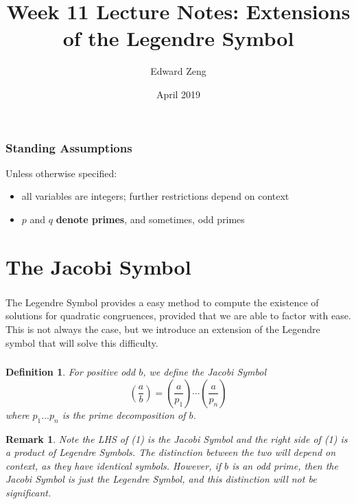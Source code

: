 \documentclass[12pt]{article}
\title{Week 11 Lecture Notes: Extensions of the Legendre Symbol}
\author{Edward Zeng}
\date{April 2019}
\newtheorem{definition}{Definition}
\newtheorem*{remark}{Remark}
\newcommand{\legendre}[2]{\genfrac{(}{)}{}{}{#1}{#2}}
\newcommand{\jacobi}[2]{\genfrac{(}{)}{}{}{#1}{#2}}
\begin{document}
\maketitle

\subsubsection{Standing Assumptions}
Unless otherwise specified:
\begin{itemize}
    \item all variables are integers; further restrictions depend on context
    \item $p$ and $q$ \textbf{denote primes}, and sometimes, odd primes
\end{itemize}

\section{The Jacobi Symbol}
\subsubsection{}
The Legendre Symbol provides a easy method to compute the existence of solutions for quadratic congruences, provided that we are able to factor with ease. This is not always the case, but we introduce an extension of the Legendre symbol that will solve this difficulty.

\subsubsection{}
\begin{definition}
    For positive odd $b$, we define the Jacobi Symbol
    \begin{equation}
        \jacobi{a}{b} = \legendre{a}{p_{1}}\cdots\legendre{a}{p_{n}}
    \end{equation}
    where $p_{1}...p_{n}$ is the prime decomposition of $b$.
\end{definition}
\begin{remark}
    Note the LHS of (1) is the Jacobi Symbol and the right side of (1) is a product of Legendre Symbols. The distinction between the two will depend on context, as they have identical symbols. However, if $b$ is an odd prime, then the Jacobi Symbol is just the Legendre Symbol, and this distinction will not be significant.
\end{remark}
\end{document}
